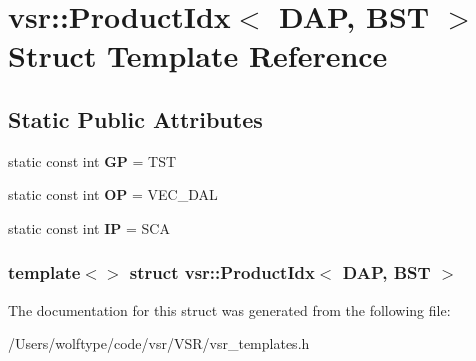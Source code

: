 \hypertarget{structvsr_1_1_product_idx_3_01_d_a_p_00_01_b_s_t_01_4}{\section{vsr\-:\-:Product\-Idx$<$ D\-A\-P, B\-S\-T $>$ Struct Template Reference}
\label{structvsr_1_1_product_idx_3_01_d_a_p_00_01_b_s_t_01_4}
}
\subsection*{Static Public Attributes}
\begin{DoxyCompactItemize}
\item 
\hypertarget{structvsr_1_1_product_idx_3_01_d_a_p_00_01_b_s_t_01_4_abd496fab394f32105e3f8db07b29075b}{static const int {\bfseries G\-P} = T\-S\-T}\label{structvsr_1_1_product_idx_3_01_d_a_p_00_01_b_s_t_01_4_abd496fab394f32105e3f8db07b29075b}

\item 
\hypertarget{structvsr_1_1_product_idx_3_01_d_a_p_00_01_b_s_t_01_4_a8e6e50dafa94998fa819c98b2b028565}{static const int {\bfseries O\-P} = V\-E\-C\-\_\-\-D\-A\-L}\label{structvsr_1_1_product_idx_3_01_d_a_p_00_01_b_s_t_01_4_a8e6e50dafa94998fa819c98b2b028565}

\item 
\hypertarget{structvsr_1_1_product_idx_3_01_d_a_p_00_01_b_s_t_01_4_af3dd1372afe5745ac5c056353a04ad06}{static const int {\bfseries I\-P} = S\-C\-A}\label{structvsr_1_1_product_idx_3_01_d_a_p_00_01_b_s_t_01_4_af3dd1372afe5745ac5c056353a04ad06}

\end{DoxyCompactItemize}
\subsubsection*{template$<$$>$ struct vsr\-::\-Product\-Idx$<$ D\-A\-P, B\-S\-T $>$}



The documentation for this struct was generated from the following file\-:\begin{DoxyCompactItemize}
\item 
/\-Users/wolftype/code/vsr/\-V\-S\-R/vsr\-\_\-templates.\-h\end{DoxyCompactItemize}
